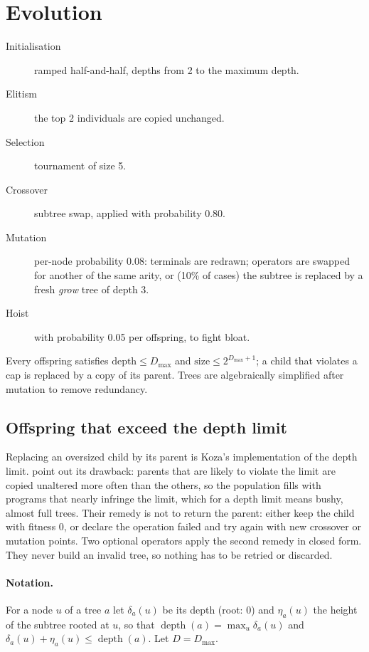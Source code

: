 \section{Evolution}
\begin{description}
  \item[Initialisation] ramped half-and-half, depths from 2 to the maximum depth.
  \item[Elitism] the top 2 individuals are copied unchanged.
  \item[Selection] tournament of size 5.
  \item[Crossover] subtree swap, applied with probability 0.80.
  \item[Mutation] per-node probability 0.08: terminals are redrawn; operators are
        swapped for another of the same arity, or (10\% of cases) the subtree is
        replaced by a fresh \emph{grow} tree of depth 3.
  \item[Hoist] with probability 0.05 per offspring, to fight bloat.
\end{description}
Every offspring satisfies $\text{depth}\le D_{\max}$ and
$\text{size}\le 2^{D_{\max}+1}$; a child that violates a cap is replaced by a copy
of its parent. Trees are algebraically simplified after mutation to remove redundancy.

\subsection{Offspring that exceed the depth limit}
\label{sec:depthaware}
Replacing an oversized child by its parent is Koza's implementation of the depth
limit. \citet[Section~11.3.2]{poli2008fieldguide} point out its drawback: parents
that are likely to violate the limit are copied unaltered more often than the
others, so the population fills with programs that nearly infringe the limit,
which for a depth limit means bushy, almost full trees. Their remedy is not to
return the parent: either keep the child with fitness $0$, or declare the
operation failed and try again with new crossover or mutation points. Two
optional operators apply the second remedy in closed form. They never build an
invalid tree, so nothing has to be retried or discarded.

\paragraph{Notation.} For a node $u$ of a tree $a$ let $\delta_a(u)$ be its depth
(root: $0$) and $\eta_a(u)$ the height of the subtree rooted at $u$, so that
$\operatorname{depth}(a)=\max_u\delta_a(u)$ and
$\delta_a(u)+\eta_a(u)\le\operatorname{depth}(a)$. Let $D=D_{\max}$.

